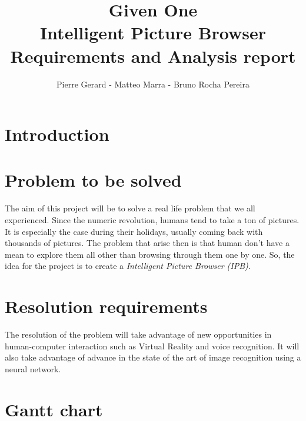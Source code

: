\documentclass[11pt,a4paper]{article}
\author{Pierre Gerard - Matteo Marra - Bruno Rocha Pereira}
\title{Given One \\ Intelligent Picture Browser \\ Requirements and Analysis report}
\begin{document}
\maketitle

\section{Introduction}

\section{Problem to be solved}

The aim of this project will be to solve a real life problem that we all experienced. Since the numeric revolution, humans tend to take a ton of pictures. It is especially the case during their holidays, usually coming back with thousands of pictures. The problem that arise then is that human don't have a mean to explore them all other than browsing through them one by one. So, the idea for the project is to create a \textit{Intelligent Picture Browser (IPB).}
 
\section{Resolution requirements}

The resolution of the problem will take advantage of new opportunities in human-computer interaction such as Virtual Reality and voice recognition. It will also take advantage of advance in the state of the art of image recognition using a neural network.

\section{Gantt chart}
\end{document}
